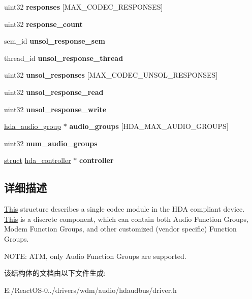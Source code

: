 \begin{DoxyCompactItemize}
uint32 {\bfseries responses} \mbox{[}M\+A\+X\+\_\+\+C\+O\+D\+E\+C\+\_\+\+R\+E\+S\+P\+O\+N\+S\+ES\mbox{]}
\item 
\mbox{\label{structhda__codec_adb463ccb10f0dd9313046a79f222aedf}} 
uint32 {\bfseries response\+\_\+count}
\item 
\mbox{\label{structhda__codec_a613dfc254b3b49abd95bda02e16b99a2}} 
sem\+\_\+id {\bfseries unsol\+\_\+response\+\_\+sem}
\item 
\mbox{\label{structhda__codec_a25ccdf59c830778189ccc30aa52a197f}} 
thread\+\_\+id {\bfseries unsol\+\_\+response\+\_\+thread}
\item 
\mbox{\label{structhda__codec_a26a54b0fe4020c44ba0577be0e002473}} 
uint32 {\bfseries unsol\+\_\+responses} \mbox{[}M\+A\+X\+\_\+\+C\+O\+D\+E\+C\+\_\+\+U\+N\+S\+O\+L\+\_\+\+R\+E\+S\+P\+O\+N\+S\+ES\mbox{]}
\item 
\mbox{\label{structhda__codec_a326a7075741d9ec202832913d9ab9291}} 
uint32 {\bfseries unsol\+\_\+response\+\_\+read}
\item 
\mbox{\label{structhda__codec_aed069c16c9eb117cb70fd19a2b51b468}} 
uint32 {\bfseries unsol\+\_\+response\+\_\+write}
\item 
\mbox{\label{structhda__codec_a91a95c42da56fd9de529e9e710b867bb}} 
\hyperlink{structhda__audio__group}{hda\+\_\+audio\+\_\+group} $\ast$ {\bfseries audio\+\_\+groups} \mbox{[}H\+D\+A\+\_\+\+M\+A\+X\+\_\+\+A\+U\+D\+I\+O\+\_\+\+G\+R\+O\+U\+PS\mbox{]}
\item 
\mbox{\label{structhda__codec_acc32c3e6968e856ca39d585c0912c66b}} 
uint32 {\bfseries num\+\_\+audio\+\_\+groups}
\item 
\mbox{\label{structhda__codec_a6bd9a9fc5622c81cf17a76423ff8e8a6}} 
\hyperlink{interfacestruct}{struct} \hyperlink{structhda__controller}{hda\+\_\+controller} $\ast$ {\bfseries controller}
\end{DoxyCompactItemize}


\subsection{详细描述}
\hyperlink{namespace_this}{This} structure describes a single codec module in the H\+DA compliant device. \hyperlink{namespace_this}{This} is a discrete component, which can contain both Audio Function Groups, Modem Function Groups, and other customized (vendor specific) Function Groups.

N\+O\+TE\+: A\+TM, only Audio Function Groups are supported. 

该结构体的文档由以下文件生成\+:\begin{DoxyCompactItemize}
\item 
E\+:/\+React\+O\+S-\/0../drivers/wdm/audio/hdaudbus/driver.\+h\end{DoxyCompactItemize}

